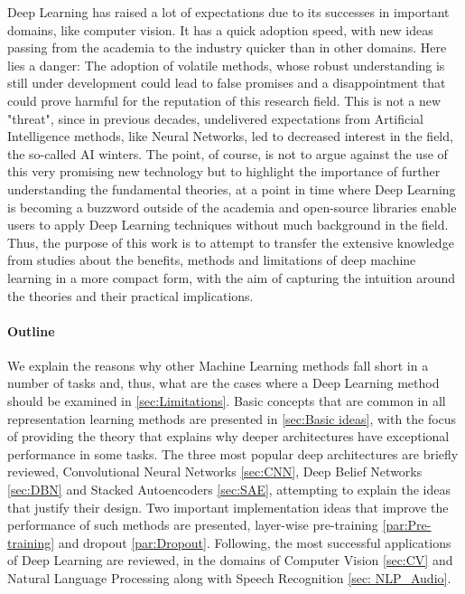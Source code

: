 \documentclass[a4paper]{article}
\begin{document}
	Deep Learning has raised a lot of expectations due to its successes in important domains, like computer vision. It has a quick adoption speed, with new ideas passing from the academia to the industry quicker than in other domains. Here lies a danger: The adoption of volatile methods, whose robust understanding is still under development could lead to false promises and a disappointment that could prove harmful for the reputation of this research field. This is not a new "threat", since in previous decades, undelivered expectations from Artificial Intelligence methods, like Neural Networks, led to decreased interest in the field, the so-called AI winters. The point, of course, is not to argue against the use of this very promising new technology but to highlight the importance of further understanding the fundamental theories, at a point in time where Deep Learning is becoming a buzzword outside of the academia and open-source libraries enable users to apply Deep Learning techniques without much background in the field. Thus, the purpose of this work is to attempt to transfer the extensive knowledge from studies about the benefits, methods and limitations of deep machine learning in a more compact form, with the aim of capturing the intuition around the theories and their practical implications.
	
	
	\paragraph{Outline}
		We explain the reasons why other Machine Learning methods fall short in a number of tasks and, thus, what are the cases where a Deep Learning method should be examined in \autoref{sec:Limitations}.	Basic concepts that are common in all representation learning methods are presented in \autoref{sec:Basic ideas}, with the focus of providing the theory that explains why deeper architectures have exceptional performance in some tasks.
		The three most popular deep architectures are briefly reviewed, Convolutional Neural Networks \ref{sec:CNN}, Deep Belief Networks \ref{sec:DBN} and Stacked Autoencoders \ref{sec:SAE}, attempting to explain the ideas that justify their design. Two important implementation ideas that improve the performance of such methods are presented, layer-wise pre-training \ref{par:Pre-training} and dropout \ref{par:Dropout}.
		Following, the most successful applications of Deep Learning are reviewed, in the domains of Computer Vision \ref{sec:CV} and Natural Language Processing along with Speech Recognition \ref{sec: NLP_Audio}.
		
\end{document}
